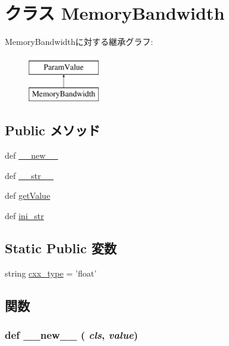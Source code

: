 \hypertarget{classm5_1_1params_1_1MemoryBandwidth}{
\section{クラス MemoryBandwidth}
\label{classm5_1_1params_1_1MemoryBandwidth}
}
MemoryBandwidthに対する継承グラフ:\begin{figure}[H]
\begin{center}
\leavevmode
\includegraphics[height=2cm]{classm5_1_1params_1_1MemoryBandwidth}
\end{center}
\end{figure}
\subsection*{Public メソッド}
\begin{DoxyCompactItemize}
\item 
def \hyperlink{classm5_1_1params_1_1MemoryBandwidth_a2f15a4676204349e06bcced484b06b70}{\_\-\_\-new\_\-\_\-}
\item 
def \hyperlink{classm5_1_1params_1_1MemoryBandwidth_aa7a4b9bc0941308e362738503137460e}{\_\-\_\-str\_\-\_\-}
\item 
def \hyperlink{classm5_1_1params_1_1MemoryBandwidth_acc340fbd4335fa34f9d57fb454b28ed0}{getValue}
\item 
def \hyperlink{classm5_1_1params_1_1MemoryBandwidth_a33ebe6cd32bcbd15465fc28b9d94bf82}{ini\_\-str}
\end{DoxyCompactItemize}
\subsection*{Static Public 変数}
\begin{DoxyCompactItemize}
\item 
string \hyperlink{classm5_1_1params_1_1MemoryBandwidth_a2f1553ebb79374a68b36fdd6d8d82fc3}{cxx\_\-type} = 'float'
\end{DoxyCompactItemize}


\subsection{関数}
\hypertarget{classm5_1_1params_1_1MemoryBandwidth_a2f15a4676204349e06bcced484b06b70}{
\subsubsection[{\_\-\_\-new\_\-\_\-}]{\setlength{\rightskip}{0pt plus 5cm}def \_\-\_\-new\_\-\_\- ( {\em cls}, \/   {\em value})}}
\label{classm5_1_1params_1_1MemoryBandwidth_a2f15a4676204349e06bcced484b06b70}




